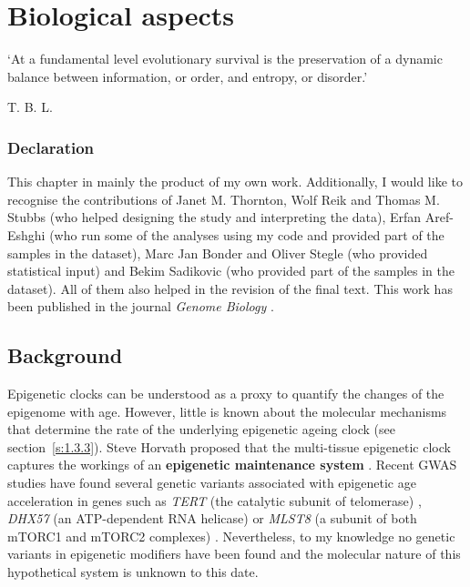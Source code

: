
\chapter{Biological aspects}  \label{c:3}

\ifpdf
    \graphicspath{{Chapter3/Figs/Raster/}{Chapter3/Figs/PDF/}{Chapter3/Figs/}}
\else
    \graphicspath{{Chapter3/Figs/Vector/}{Chapter3/Figs/}}
\fi



\epigraph{`At a fundamental level evolutionary survival is the preservation of a dynamic balance between information, or order, and entropy, or disorder.'}{T. B. L. \citet{Kirkwood1977}}


\subsection*{Declaration} 

\footnotesize

This chapter in mainly the product of my own work. Additionally, I would like to recognise the contributions of Janet M. Thornton, Wolf Reik and Thomas M. Stubbs (who helped designing the study and interpreting the data), Erfan Aref-Eshghi (who run some of the analyses using my code and provided part of the samples in the dataset), Marc Jan Bonder and Oliver Stegle (who provided statistical input) and Bekim Sadikovic (who provided part of the samples in the dataset). All of them also helped in the revision of the final text. This work has been published in the journal \textit{Genome Biology} \citep{Martin-Herranz2019a}.

\normalsize

\section{Background} 

\smallskip

Epigenetic clocks can be understood as a proxy to quantify the changes of the epigenome with age. However, little is known about the molecular mechanisms that determine the rate of the underlying epigenetic ageing clock (see section~\ref{s:1.3.3}). Steve Horvath proposed that the multi-tissue epigenetic clock captures the workings of an \textbf{epigenetic maintenance system} \citep{Horvath2013}. Recent \acrshort{GWAS} studies have found several genetic variants associated with epigenetic age acceleration in genes such as \textit{TERT} (the catalytic subunit of telomerase) \citep{Lu2018}, \textit{DHX57} (an ATP-dependent RNA helicase) \citep{Lu2016} or \textit{MLST8} (a subunit of both mTORC1 and mTORC2 complexes) \citep{Lu2016}. Nevertheless, to my knowledge no genetic variants in epigenetic modifiers have been found and the molecular nature of this hypothetical system is unknown to this date.

